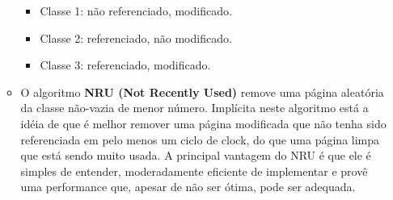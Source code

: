 \documentclass[10pt]{article}
\begin{document}
\begin{itemize}
\begin{itemize}
\begin{itemize}
                    \item Classe 1: não referenciado, modificado.
                    \item Classe 2: referenciado, não modificado.
                    \item Classe 3: referenciado, modificado.
                \end{itemize}
            \item O algoritmo \textbf{NRU (Not Recently Used)} remove uma página aleatória
                da classe não-vazia de menor número. Implícita neste algoritmo está a idéia
                de que é melhor remover uma página modificada que não tenha sido referenciada
                em pelo menos um ciclo de clock, do que uma página limpa que está sendo muito
                usada. A principal vantagem do NRU é que ele é simples de entender, moderadamente
                eficiente de implementar e provê uma performance que, apesar de não ser ótima,
                pode ser adequada.
        \end{itemize}
\end{itemize}
\end{document}
